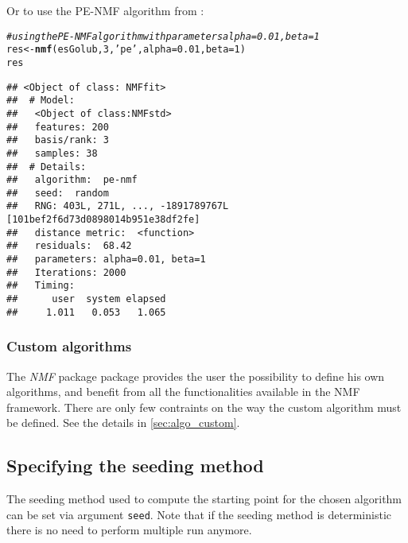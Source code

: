 \documentclass[a4paper]{article}\usepackage[]{graphicx}\usepackage[]{color}
\makeatletter
\newcommand{\hlnum}[1]{\textcolor[rgb]{0.686,0.059,0.569}{#1}}%
\newcommand{\hlstr}[1]{\textcolor[rgb]{0.192,0.494,0.8}{#1}}%
\newcommand{\hlcom}[1]{\textcolor[rgb]{0.678,0.584,0.686}{\textit{#1}}}%
\newcommand{\hlstd}[1]{\textcolor[rgb]{0.345,0.345,0.345}{#1}}%
\newcommand{\hlkwb}[1]{\textcolor[rgb]{0.69,0.353,0.396}{#1}}%
\newcommand{\hlkwc}[1]{\textcolor[rgb]{0.333,0.667,0.333}{#1}}%
\newcommand{\hlkwd}[1]{\textcolor[rgb]{0.737,0.353,0.396}{\textbf{#1}}}%
\newenvironment{kframe}{%
 \def\at@end@of@kframe{}%
 \ifinner\ifhmode%
  \def\at@end@of@kframe{\end{minipage}}%
  \begin{minipage}{\columnwidth}%
 \fi\fi%
 \def\FrameCommand##1{\hskip\@totalleftmargin \hskip-\fboxsep
 \colorbox{shadecolor}{##1}\hskip-\fboxsep
     \hskip-\linewidth \hskip-\@totalleftmargin \hskip\columnwidth}%
 \MakeFramed {\advance\hsize-\width
   \@totalleftmargin\z@ \linewidth\hsize
   \@setminipage}}%
 {\par\unskip\endMakeFramed%
 \at@end@of@kframe}
\newenvironment{knitrout}{}{} %
\let\code=\texttt
\newcommand{\pkgname}[1]{\textit{#1}\xspace}
\newcommand{\Rpkg}[1]{\pkgname{#1} package\xspace}
\newcommand{\nmfpack}{\Rpkg{NMF}}
\renewcommand{\cite}[1]{\parencite{#1}}
\makeatother
\begin{document}
Or to use the PE-NMF algorithm from \cite{Zhang2008}:
\begin{knitrout}
\color{fgcolor}\begin{kframe}
\begin{alltt}
\hlcom{# using the PE-NMF algorithm with parameters alpha=0.01, beta=1}
\hlstd{res} \hlkwb{<-} \hlkwd{nmf}\hlstd{(esGolub,} \hlnum{3}\hlstd{,} \hlstr{'pe'}\hlstd{,} \hlkwc{alpha}\hlstd{=}\hlnum{0.01}\hlstd{,} \hlkwc{beta}\hlstd{=}\hlnum{1}\hlstd{)}
\hlstd{res}
\end{alltt}
\begin{verbatim}
## <Object of class: NMFfit>
##  # Model:
##   <Object of class:NMFstd>
##   features: 200 
##   basis/rank: 3 
##   samples: 38 
##  # Details:
##   algorithm:  pe-nmf 
##   seed:  random 
##   RNG: 403L, 271L, ..., -1891789767L [101bef2f6d73d0898014b951e38df2fe]
##   distance metric:  <function> 
##   residuals:  68.42 
##   parameters: alpha=0.01, beta=1 
##   Iterations: 2000 
##   Timing:
##      user  system elapsed 
##     1.011   0.053   1.065
\end{verbatim}
\end{kframe}
\end{knitrout}

%
%
%


\subsubsection{Custom algorithms}
The \nmfpack package provides the user the possibility to define his own algorithms, and benefit from all the functionalities available in the NMF framework.
There are only few contraints on the way the custom algorithm must be defined.
See the details in \cref{sec:algo_custom}.

\subsection{Specifying the seeding method}\label{sec:seed}
The seeding method used to compute the starting point for the chosen algorithm can be set via argument \code{seed}. 
Note that if the seeding method is deterministic there is no need to perform multiple run anymore.
\end{document}
